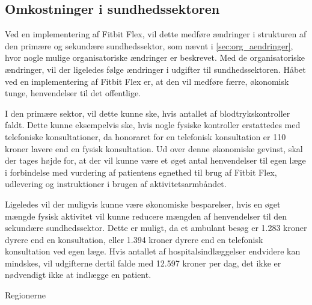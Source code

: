 \subsection{Omkostninger i sundhedssektoren}



Ved en implementering af Fitbit Flex, vil dette medføre ændringer i strukturen af den primære og sekundære sundhedssektor, som nævnt i \autoref{sec:org_aendringer}, hvor nogle mulige organisatoriske ændringer er beskrevet. Med de organisatoriske ændringer, vil der ligeledes følge ændringer i udgifter til sundhedssektoren. 
Håbet ved en implementering af Fitbit Flex er, at den vil medføre færre, økonomisk tunge, henvendelser til det offentlige. 

I den primære sektor, vil dette kunne ske, hvis antallet af blodtrykskontroller faldt. Dette kunne eksempelvis ske, hvis nogle fysiske kontroller erstattedes med telefoniske konsultationer, da honoraret for en telefonisk konsultation er 110 kroner lavere end en fysisk konsultation. Ud over denne økonomiske gevinst, skal der tages højde for, at der vil kunne være et øget antal henvendelser til egen læge i forbindelse med vurdering af patientens egnethed til brug af Fitbit Flex, udlevering og instruktioner i brugen af aktivitetsarmbåndet. 
 
Ligeledes vil der muligvis kunne være økonomiske besparelser, hvis en øget mængde fysisk aktivitet vil kunne reducere mængden af henvendelser til den sekundære sundhedssektor. Dette er muligt, da et ambulant besøg er 1.283 kroner dyrere end en konsultation, eller 1.394 kroner dyrere end en telefonisk konsultation ved egen læge. Hvis antallet af hospitalsindlæggelser endvidere kan mindskes, vil udgifterne dertil falde med 12.597 kroner per dag, det ikke er nødvendigt ikke at indlægge en patient. 

Regionerne

